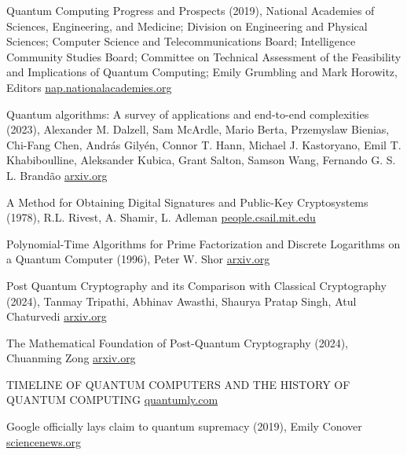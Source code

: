\documentclass[fleqn, 12pt]{article}
\begin{document}
\newpage
{
\raggedright
\renewcommand{\refname}{Reference}
\begin{thebibliography}{9}
     Quantum Computing Progress and Prospects (2019), National Academies of Sciences, Engineering, and Medicine; Division on Engineering and Physical Sciences; Computer Science and Telecommunications Board; Intelligence Community Studies Board; Committee on Technical Assessment of the Feasibility and Implications of Quantum Computing; Emily Grumbling and Mark Horowitz, Editors \href{https://nap.nationalacademies.org/catalog/25196/quantum-computing-progress-and-prospects}{nap.nationalacademies.org}
    
     Quantum algorithms: A survey of applications and end-to-end complexities (2023), Alexander M. Dalzell, Sam McArdle, Mario Berta, Przemyslaw Bienias, Chi-Fang Chen, András Gilyén, Connor T. Hann, Michael J. Kastoryano, Emil T. Khabiboulline, Aleksander Kubica, Grant Salton, Samson Wang, Fernando G. S. L. Brandão \href{https://arxiv.org/abs/2310.03011}{arxiv.org}
    
     A Method for Obtaining Digital Signatures and Public-Key Cryptosystems (1978), R.L. Rivest, A. Shamir, L. Adleman \href{http://people.csail.mit.edu/rivest/Rsapaper.pdf}{people.csail.mit.edu}
    
     Polynomial-Time Algorithms for Prime Factorization and Discrete Logarithms on a Quantum Computer (1996), Peter W. Shor \href{https://arxiv.org/abs/quant-ph/9508027}{arxiv.org}
    
     Post Quantum Cryptography and its Comparison with Classical Cryptography (2024), Tanmay Tripathi, Abhinav Awasthi, Shaurya Pratap Singh, Atul Chaturvedi \href{https://arxiv.org/abs/2403.19299}{arxiv.org}
    
     The Mathematical Foundation of Post-Quantum Cryptography (2024), Chuanming Zong \href{https://arxiv.org/abs/2404.19186}{arxiv.org}

     TIMELINE OF QUANTUM COMPUTERS AND THE HISTORY OF QUANTUM COMPUTING \href{http://quantumly.com/timeline-of-quantum-computing-history-of-quantum-computers-dates.html}{quantumly.com}

     Google officially lays claim to quantum supremacy (2019), Emily Conover \href{https://www.sciencenews.org/article/google-quantum-computer-supremacy-claim}{sciencenews.org}
\end{thebibliography}
}
\end{document}
